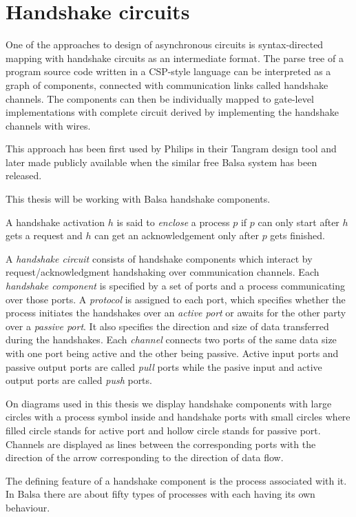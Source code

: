 
\section{Handshake circuits}

One of the approaches to design of asynchronous circuits is syntax-directed mapping with 
handshake circuits as an intermediate format. The parse tree of a program source code written in 
a CSP-style \cite{csp} language can be interpreted as a graph of components, connected with communication links
called handshake channels. The components can then be individually mapped to gate-level implementations
with complete circuit derived by implementing the handshake channels with wires.

This approach has been first used by Philips in their Tangram \cite{tangram} design tool
and later made publicly available when the similar free Balsa \cite{balsa} system has been released.

This thesis will be working with Balsa handshake components.

A handshake activation $h$ is said to \emph{enclose} a process $p$ if $p$ can only start after $h$ gets a request and $h$ can get an acknowledgement only after $p$ gets finished.

A \emph{handshake circuit} consists of handshake components which interact by request\slash acknowledgment handshaking 
over communication channels.
Each \emph{handshake component} is specified by a set of ports and a process communicating over those ports.
A \emph{protocol} is assigned to each port, which specifies whether the process initiates the handshakes
over an \emph{active port} or awaits for the other party over a \emph{passive port}. 
It also specifies the direction and size of data transferred during the handshakes.
Each \emph{channel} connects two ports of the same data size with one port being active and the other being passive.
Active input ports and passive output ports are called \emph{pull} ports while the pasive input and active output ports are called \emph{push} ports.

On diagrams used in this thesis we display handshake components with large circles with a process symbol inside
and handshake ports with small circles where filled circle stands for active port and hollow circle stands for passive port.
Channels are displayed as lines between the corresponding ports with the direction of the arrow corresponding to the
direction of data flow.

The defining feature of a handshake component is the process associated with it.
In Balsa there are about fifty types of processes with each having its own behaviour.

